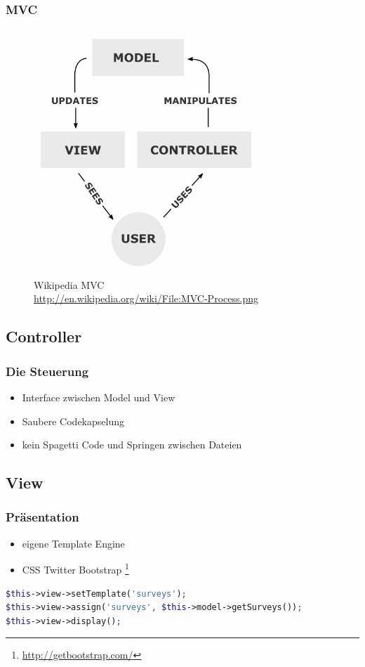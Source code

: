 \documentclass[xcolor=dvipsnames]{beamer}
\begin{document}
\begin{frame} %
\frametitle{MVC} %
\begin{figure}
\includegraphics[scale=0.4]{MVC-Process.png}
\caption{Wikipedia MVC \\ \tiny{\textcolor{gray}{\url{http://en.wikipedia.org/wiki/File:MVC-Process.png}}}}
\end{figure}
\end{frame}


\subsection{Controller}
\begin{frame} %
  \frametitle{Die Steuerung} %
  \begin{block}{}
	  \begin{itemize}
  		\item Interface zwischen Model und View
  		\item Saubere Codekapselung
  		\item kein Spagetti Code und Springen zwischen Dateien
	  \end{itemize}
  \end{block} 
\end{frame}

\subsection{View}
\begin{frame}[fragile] %
  \frametitle{Präsentation} %
  \begin{block}{}
	  \begin{itemize}
  		\item eigene Template Engine
  		\item CSS Twitter Bootstrap \footnote{\url{http://getbootstrap.com/}}
	  \end{itemize}
  \end{block}
  
\begin{lstlisting}[language=PHP, caption=Template Engine]
$this->view->setTemplate('surveys');
$this->view->assign('surveys', $this->model->getSurveys());
$this->view->display();
\end{lstlisting} 

\end{frame}
\end{document}
